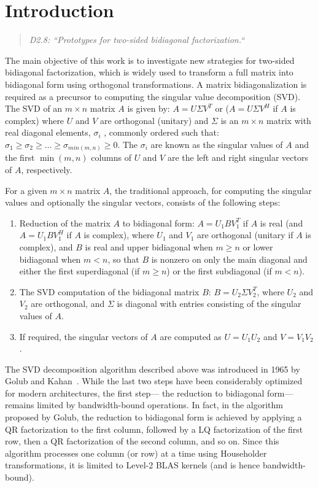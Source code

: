 \section{Introduction}
\begin{quotation}
  \emph{D2.8:
    ``Prototypes for two-sided bidiagonal factorization.``
  }
\end{quotation}
The main objective of this work is to investigate new strategies for 
two-sided bidiagonal factorization,
which is widely used to
transform a full matrix into bidiagonal form using orthogonal transformations.
A matrix bidiagonalization is required as a precursor to computing the
singular value decomposition (SVD).
The SVD of an $m\times n$ matrix $A$ is given by:
$A = U \Sigma V^T$ or ($A = U \Sigma V^H$ if $A$ is complex) where
$U$ and $V$ are orthogonal (unitary) and $\Sigma$ is an $m\times n$
matrix with real diagonal elements, $\sigma_i$ , commonly ordered such
that: $\sigma_1 \ge \sigma_2 \ge \dots \ge \sigma_{min(m,n)} \ge 0.$
The $\sigma_i$ are known as the singular values of $A$
and the first $\min(m, n)$ columns
of $U$ and $V$ are the left and right singular vectors of $A$, respectively.

For a given $m\times n$ matrix $A$,
the traditional approach, for computing the singular
values and optionally the singular vectors,
consists of the following steps:
\begin{enumerate}
\item Reduction of the matrix $A$ to bidiagonal form:
$A = U_1BV^T_1$ if $A$ is real (and $A = U_1BV^H_1$ if $A$ is complex), where
  $U_1$ and $V_1$ are orthogonal (unitary if $A$ is complex), and $B$ is
  real and upper bidiagonal when $m \ge n$ or lower bidiagonal when $m < n$,
  so that $B$ is nonzero on only the main diagonal and either the first
  superdiagonal (if $m \ge n$) or the first subdiagonal (if $m < n$).

\item The SVD computation of the bidiagonal matrix $B$: $B = U_2 \Sigma
  V_2^T$, where $U_2$ and $V_2$ are orthogonal, and $\Sigma$ is
  diagonal with entries consisting of the singular values of $A$.
\item If required, the singular vectors of $A$ are computed as
  $U = U_1U_2$ and $V = V_1 V_2$.
\end{enumerate}

The SVD decomposition algorithm described above was introduced in
1965 by Golub and Kahan~\cite{golub1965calculating}.
While the last two steps have been considerably optimized
for modern architectures,
the first step---%
the reduction to bidiagonal form---%
remains limited by
bandwidth-bound operations.
In fact, in the algorithm proposed by Golub,
the reduction to bidiagonal form is achieved by applying a QR factorization to
the first column, followed by a LQ factorization of the first row, then a QR
factorization of the second column, and so on. Since this algorithm processes
one column (or row) at a time using Householder transformations,
it is limited to Level-2 BLAS kernels (and is hence bandwidth-bound).

